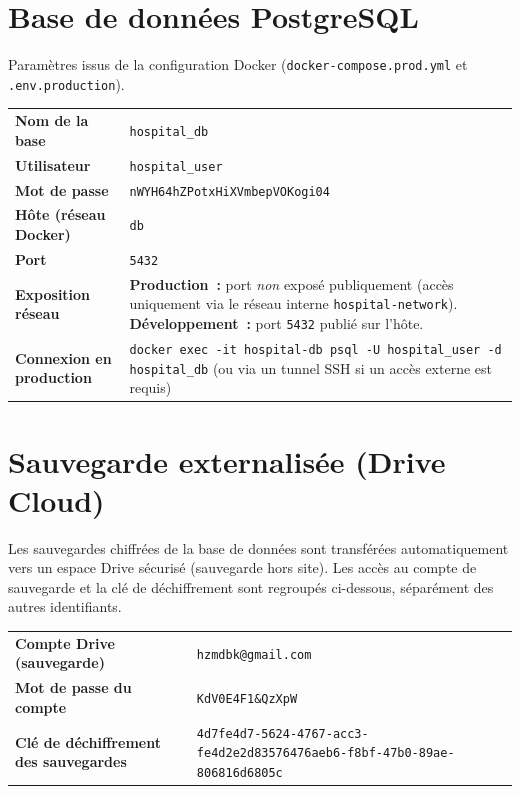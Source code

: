 \documentclass[11pt,a4paper]{article}
\newcommand{\fiche}[2]{%
  \par\smallskip
  \begin{tabularx}{\textwidth}{|>{\raggedright\arraybackslash}p{5.4cm}|>{\raggedright\arraybackslash}X|}
  \hline
  \rowcolor{headbg}\multicolumn{2}{|l|}{\textbf{\textcolor{white}{#1}}}\\\hline
  #2
  \hline
  \end{tabularx}\par\smallskip
}
\newcommand{\code}[1]{\texttt{#1}}
\begin{document}
\section{Base de données PostgreSQL}
Paramètres issus de la configuration Docker (\code{docker-compose.prod.yml} et \code{.env.production}).
\fiche{Moteur PostgreSQL 16 — conteneur \texttt{hospital-db}}{
  \textbf{Nom de la base} & \code{hospital\_db} \\\hline
  \textbf{Utilisateur} & \code{hospital\_user} \\\hline
  \textbf{Mot de passe} & \code{nWYH64hZPotxHiXVmbepVOKogi04} \\\hline
  \textbf{Hôte (réseau Docker)} & \code{db} \\\hline
  \textbf{Port} & \code{5432} \\\hline
  \textbf{Exposition réseau} & \textbf{Production~:} port \emph{non} exposé publiquement (accès uniquement via le réseau interne \code{hospital-network}). \newline \textbf{Développement~:} port \code{5432} publié sur l'hôte. \\\hline
  \textbf{Connexion en production} & \code{docker exec -it hospital-db psql -U hospital\_user -d hospital\_db} \newline (ou via un tunnel SSH si un accès externe est requis) \\
}

\section{Sauvegarde externalisée (Drive Cloud)}
Les sauvegardes chiffrées de la base de données sont transférées automatiquement vers un espace Drive sécurisé (sauvegarde hors site). Les accès au compte de sauvegarde et la clé de déchiffrement sont regroupés ci-dessous, séparément des autres identifiants.
\fiche{Compte de sauvegarde \& clé de déchiffrement}{
  \textbf{Compte Drive (sauvegarde)} & \code{hzmdbk@gmail.com} \\\hline
  \textbf{Mot de passe du compte} & \code{KdV0E4F1\&QzXpW} \\\hline
  \textbf{Clé de déchiffrement des sauvegardes} & {\small\code{4d7fe4d7-\allowbreak{}5624-\allowbreak{}4767-\allowbreak{}acc3-\allowbreak{}fe4d2e2d83576476aeb6-\allowbreak{}f8bf-\allowbreak{}47b0-\allowbreak{}89ae-\allowbreak{}806816d6805c}} \\
}
\end{document}
